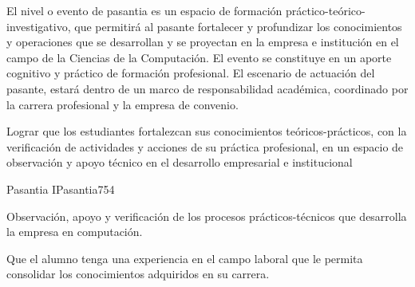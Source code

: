 \begin{syllabus}


\begin{justification}
El nivel o evento de pasantia es un espacio de formación práctico-teórico-investigativo, que permitirá al pasante fortalecer y profundizar los conocimientos y operaciones que se desarrollan y se proyectan en la empresa e institución en el campo de la Ciencias de la Computación. El evento se constituye en un aporte cognitivo y práctico de formación profesional. El escenario de actuación del pasante, estará dentro de un marco de responsabilidad académica, coordinado por la carrera profesional y la empresa de convenio.
\end{justification}

\begin{goals}
\item Lograr que los estudiantes fortalezcan sus conocimientos teóricos-prácticos, con la verificación de actividades y acciones de su práctica profesional, en un espacio de observación y apoyo técnico en el desarrollo empresarial e institucional  
\end{goals}

\begin{outcomes}
\end{outcomes}

\begin{unit}{Pasantia I}{Pasantia}{75}{4}
   \begin{topics}
      \item Observación, apoyo y verificación de los procesos prácticos-técnicos que desarrolla la empresa en computación.
   \end{topics}
   
   \begin{unitgoals}
      \item Que el alumno tenga una experiencia en el campo laboral que le permita consolidar los conocimientos adquiridos en su carrera.
   \end{unitgoals}
\end{unit}

\begin{coursebibliography}
\end{coursebibliography}

\end{syllabus}
